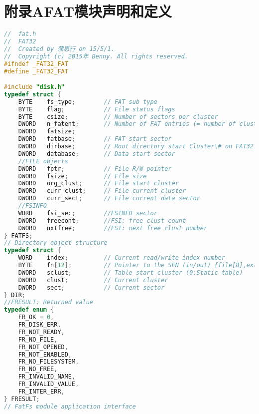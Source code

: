 
\chapter{附录A\quad FAT模块声明和定义}
\label{chap:fsrc}
\begin{lstlisting}[language={C}, caption={FAT.H}]
//  fat.h
//  FAT32
//  Created by 蒲思行 on 15/5/1.
//  Copyright (c) 2015年 Benny. All rights reserved.
#ifndef _FAT32_FAT
#define _FAT32_FAT

#include "disk.h"
typedef struct {
	BYTE	fs_type;	    // FAT sub type
	BYTE	flag;		    // File status flags
	BYTE	csize;		    // Number of sectors per cluster
	DWORD	n_fatent;	    // Number of FAT entries (= number of clusters + 2)
    DWORD   fatsize;
	DWORD	fatbase;	    // FAT start sector
	DWORD	dirbase;	    // Root directory start Cluster\# on FAT32
	DWORD	database;	    // Data start sector
	//FILE objects
    DWORD	fptr;           // File R/W pointer
	DWORD	fsize;          // File size
	DWORD	org_clust;      // File start cluster
	DWORD	curr_clust;     // File current cluster
	DWORD	curr_sect;		// File current data sector
    //FSINFO
    WORD    fsi_sec;        //FSINFO sector
    DWORD   freecont;       //FSI: free clust count
    DWORD   nxtfree;        //FSI: next free clust number
} FATFS;
// Directory object structure
typedef struct {
	WORD	index;		    // Current read/write index number
	BYTE	fn[12];			// Pointer to the SFN (in/out) {file[8],ext[3]}
	DWORD	sclust;		    // Table start cluster (0:Static table)
	DWORD	clust;		    // Current cluster
	DWORD	sect;		    // Current sector
} DIR;
//FRESULT: Returned value
typedef enum {
	FR_OK = 0,			
	FR_DISK_ERR,		
	FR_NOT_READY,		
	FR_NO_FILE,			
	FR_NOT_OPENED,		
	FR_NOT_ENABLED,		
	FR_NO_FILESYSTEM,
	FR_NO_FREE,	
	FR_INVALID_NAME,
	FR_INVALID_VALUE,
	FR_INTER_ERR,
} FRESULT;
// FatFs module application interface


\end{lstlisting}
